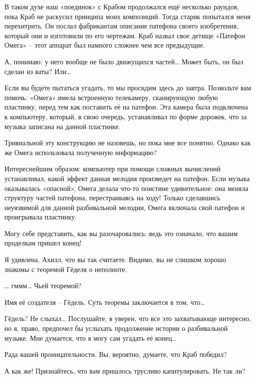 \documentclass[../main.tex]{subfiles}
\begin{document}
\begin{Dialogue}
 В таком духе наш «поединок» с Крабом продолжался ещё несколько раундов, пока Краб не раскусил принципа моих композиций. Тогда старик попытался меня перехитрить. Он послал фабрикантам описание патефона своего изобретения, который они и изготовили по его чертежам. Краб назвал свое детище «Патефон Омега» \--- этот аппарат был намного сложнее чем все предыдущие.

 А, понимаю: у него вообще не было движущихся частей\ldots{} Может быть, он был сделан из ваты? Или\ldots{}

 Если вы будете пытаться угадать, то мы просидим здесь до завтра. Позвольте вам помочь: «Омега» имела встроенную телекамеру, сканирующую любую пластинку, перед тем как поставить её на патефон. Эта камера была подключена к компьютеру, который, в свою очередь, устанавливал по форме дорожек, что за музыка записана на данной пластинке.

 Тривиальной эту конструкцию не назовешь, но пока мне все понятно. Однако как же Омега использовала полученную информацию?

 {\Large И}нтереснейшим образом: компьютер при помощи сложных вычислений устанавливал, какой эффект данная мелодия произведет на патефон. Если музыка оказывалась «опасной», Омега делала что-то поистине удивительное: она меняла структуру частей патефона, перестраиваясь на ходу! Только сделавшись неуязвимой для данной разбивальной мелодии, Омега включала свой патефон и проигрывала пластинку.

 Могу себе представить, как вы разочаровались: ведь это означало, что вашим проделкам пришел конец!

 Я удивлена, Ахилл, что вы так считаете. Видимо, вы не слишком хорошо знакомы с теоремой Гёделя о неполноте.

 \ldots{} гммм\ldots{} Чьей теоремой?

 {\Large И}мя её создателя \--- Гёдель. Суть теоремы заключается в том, что\ldots{}

 Гёдель? Не слыхал\ldots{} Послушайте, я уверен, что все это захватывающе интересно, но я, право, предпочел бы услыхать продолжение истории о разбивальной музыке. Мне думается, что я могу сам угадать её конец\ldots{}

 Рада вашей проницательности. Вы, вероятно, думаете, что Краб победил?

 А как же! Признайтесь, что вам пришлось трусливо капитулировать. Не так ли?


\end{Dialogue}
\end{document}
